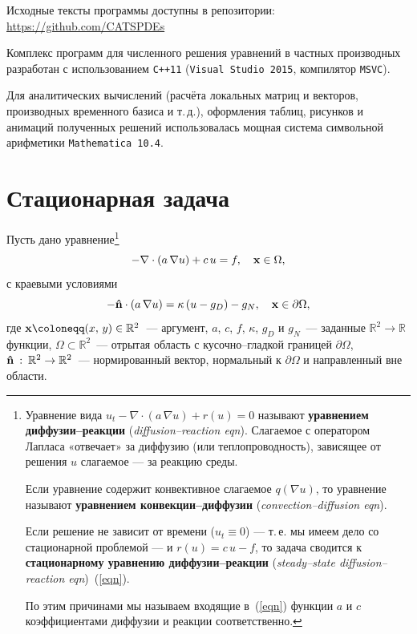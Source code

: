 Исходные тексты программы доступны в репозитории:\\
\url{https://github.com/CATSPDEs}

Комплекс программ для численного решения уравнений в частных производных разработан с использованием \texttt{C++11} (\texttt{Visual Studio 2015}, компилятор \texttt{MSVC}).

Для аналитических вычислений (расчёта локальных матриц и векторов, производных временного базиса и т.\,д.), оформления таблиц, рисунков и анимаций полученных решений использовалась мощная система символьной арифметики \texttt{Mathematica 10.4}.

\section{Стационарная задача}
\label{stationary}

Пусть дано уравнение\footnote{
	Уравнение вида $u_t - \nabla \cdot (a \, \nabla u) + r(u) = 0$ называют \textbf{уравнением диффузии--реакции} (\textit{diffusion--reaction eqn}). Слагаемое с оператором Лапласа «отвечает» за диффузию (или теплопроводность), зависящее от решения $u$ слагаемое --- за реакцию среды. 
	
	Если уравнение содержит конвективное слагаемое $q(\nabla u)$, то уравнение называют \textbf{уравнением конвекции--диффузии} (\textit{convection--diffusion eqn}).
	
	Если решение не зависит от времени ($u_t \equiv 0$) --- т.\,е. мы имеем дело со стационарной проблемой --- и $r(u) = c \, u - f$, то задача сводится к \textbf{стационарному уравнению диффузии--реакции} (\textit{steady--state diffusion--reaction eqn})~(\ref{eqn}).
	
	По этим причинами мы называем входящие в~(\ref{eqn}) функции $a$ и $c$ коэффициентами диффузии и реакции соответственно.  
}
\begin{equation}
	\label{eqn}
	- \nabla \cdot (a \, \nabla u) + c \, u = f, \quad \boldsymbol{\mathbf{x}} \in \Omega,
\end{equation}
с краевыми условиями
\begin{equation}
	\label{BCs}
	- \boldsymbol{\mathbf{\hat{n}}} \cdot (a \, \nabla u) = \kappa \, (u - g_D) - g_N, \quad \boldsymbol{\mathbf{x}} \in \partial \Omega,
\end{equation}
где $\vect{x} \coloneqq (x, \, y) \in \mathbb{R}^2$~--- аргумент, $a$, $c$, $f$, $\kappa$, $g_D$ и $g_N$~--- заданные $\mathbb{R}^2 \rightarrow \mathbb{R}$ функции, $\Omega \subset \mathbb{R}^2$~--- отрытая область с кусочно--гладкой границей $\partial \Omega$, $\boldsymbol{\mathbf{\hat{n}}} \: : \: \mathbb{R}^2 \rightarrow \mathbb{R}^2$~--- нормированный вектор, нормальный к $\partial \Omega$ и направленный вне области. 

